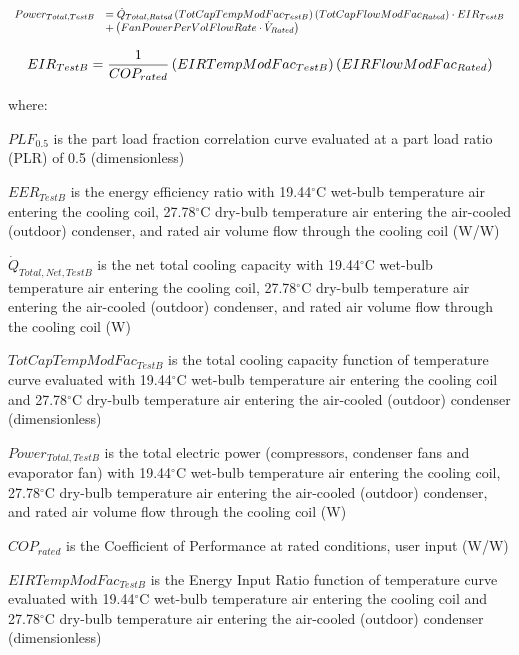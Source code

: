\begin{equation}
  \begin{array}{rl}
    Power_{Total,TestB} &= \dot{Q}_{Total,Rated} \left(TotCapTempModFac_{TestB}\right)\left(TotCapFlowModFac_{Rated}\right)\cdot EIR_{TestB} \\
                        &+ \left(FanPowerPerVolFlowRate \cdot \dot{V}_{Rated}\right)
  \end{array}
\end{equation}

\begin{equation}
  EIR_{TestB} = \frac{1}{COP_{rated}}\left(EIRTempModFac_{TestB}\right)\left(EIRFlowModFac_{Rated}\right)
\end{equation}

where:

\(PLF_{0.5}\) is the part load fraction correlation curve evaluated at a part load ratio (PLR) of 0.5 (dimensionless)

\(EER_{TestB}\) is the energy efficiency ratio with 19.44\(^{\circ}\)C wet-bulb temperature air entering the cooling coil, 27.78\(^{\circ}\)C dry-bulb temperature air entering the air-cooled (outdoor) condenser, and rated air volume flow through the cooling coil (W/W)

\({\dot Q_{Total,Net,TestB}}\) is the net total cooling capacity with 19.44\(^{\circ}\)C wet-bulb temperature air entering the cooling coil, 27.78\(^{\circ}\)C dry-bulb temperature air entering the air-cooled (outdoor) condenser, and rated air volume flow through the cooling coil (W)

\(TotCapTempModFa{c_{TestB}}\) is the total cooling capacity function of temperature curve evaluated with 19.44\(^{\circ}\)C wet-bulb temperature air entering the cooling coil and 27.78\(^{\circ}\)C dry-bulb temperature air entering the air-cooled (outdoor) condenser (dimensionless)

\(Powe{r_{Total,TestB}}\) is the total electric power (compressors, condenser fans and evaporator fan) with 19.44\(^{\circ}\)C wet-bulb temperature air entering the cooling coil, 27.78\(^{\circ}\)C dry-bulb temperature air entering the air-cooled (outdoor) condenser, and rated air volume flow through the cooling coil (W)

\(CO{P_{rated}}\) is the Coefficient of Performance at rated conditions, user input (W/W)

\(EIRTempModFa{c_{TestB}}\) is the Energy Input Ratio function of temperature curve evaluated with 19.44\(^{\circ}\)C wet-bulb temperature air entering the cooling coil and 27.78\(^{\circ}\)C dry-bulb temperature air entering the air-cooled (outdoor) condenser (dimensionless)


